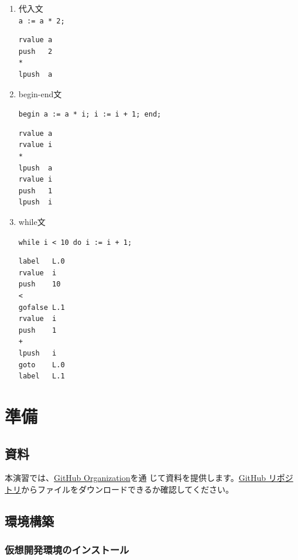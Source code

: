 \documentclass[a4paper,11pt]{jsarticle}
\begin{document}
\begin{enumerate}
\item 代入文 \\
   \texttt{a := a * 2;} \\
  \begin{lstlisting}
rvalue a
push   2
*
lpush  a
  \end{lstlisting}

\item begin-end文

   \texttt{begin a := a * i; i := i + 1; end;}

  \begin{lstlisting}
rvalue a
rvalue i
*
lpush  a
rvalue i
push   1
lpush  i
  \end{lstlisting}

\item while文

   \texttt{while i < 10 do i := i + 1;}


\begin{lstlisting}
label	L.0
rvalue	i
push	10
<
gofalse	L.1
rvalue	i
push	1
+
lpush	i
goto	L.0
label	L.1
  \end{lstlisting}

\end{enumerate}

\newpage
\section{準備}

\subsection{資料}

本演習では、\href{https://github.com/tmu-compiler-info-sys-exp-I}{GitHub Organization}を通
じて資料を提供します。\href{https://github.com/tmu-compiler-info-sys-exp-I/resume}{GitHub
  リポジトリ}からファイルをダウンロードできるか確認してください。

\subsection{環境構築}

\subsubsection{仮想開発環境のインストール}
\label{sec:virtual_machine}
\end{document}
